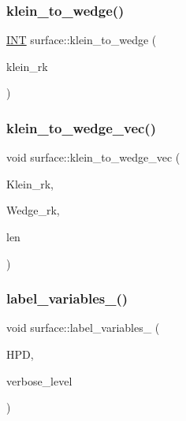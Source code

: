 \mbox{\label{classsurface_a3c8c160b16bc586f45d0c23e6b2e3e00}} 
\subsubsection{\texorpdfstring{klein\+\_\+to\+\_\+wedge()}{klein\_to\_wedge()}\hspace{0.1cm}{\footnotesize\ttfamily [2/2]}}
{\footnotesize\ttfamily \mbox{\hyperlink{galois_8h_a09fddde158a3a20bd2dcadb609de11dc}{I\+NT}} surface\+::klein\+\_\+to\+\_\+wedge (\begin{DoxyParamCaption}\item[{\mbox{\hyperlink{galois_8h_a09fddde158a3a20bd2dcadb609de11dc}{I\+NT}}}]{klein\+\_\+rk }\end{DoxyParamCaption})}

\mbox{\label{classsurface_a975f69ead008c4869721ae32f92d70d8}} 
\subsubsection{\texorpdfstring{klein\+\_\+to\+\_\+wedge\+\_\+vec()}{klein\_to\_wedge\_vec()}}
{\footnotesize\ttfamily void surface\+::klein\+\_\+to\+\_\+wedge\+\_\+vec (\begin{DoxyParamCaption}\item[{\mbox{\hyperlink{galois_8h_a09fddde158a3a20bd2dcadb609de11dc}{I\+NT}} $\ast$}]{Klein\+\_\+rk,  }\item[{\mbox{\hyperlink{galois_8h_a09fddde158a3a20bd2dcadb609de11dc}{I\+NT}} $\ast$}]{Wedge\+\_\+rk,  }\item[{\mbox{\hyperlink{galois_8h_a09fddde158a3a20bd2dcadb609de11dc}{I\+NT}}}]{len }\end{DoxyParamCaption})}

\mbox{\label{classsurface_ac29ccad78752c1f010b5991b5f4c5209}} 
\subsubsection{\texorpdfstring{label\+\_\+variables\+\_()}{label\_variables\_24()}}
{\footnotesize\ttfamily void surface\+::label\+\_\+variables\+\_ (\begin{DoxyParamCaption}\item[{\mbox{\hyperlink{classhomogeneous__polynomial__domain}{homogeneous\+\_\+polynomial\+\_\+domain}} $\ast$}]{H\+PD,  }\item[{\mbox{\hyperlink{galois_8h_a09fddde158a3a20bd2dcadb609de11dc}{I\+NT}}}]{verbose\+\_\+level }\end{DoxyParamCaption})}

